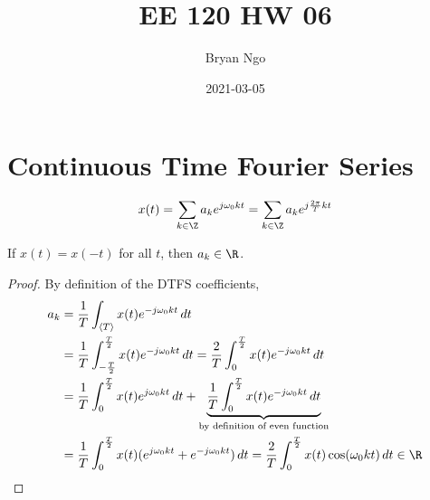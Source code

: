 \documentclass{article}
\title{EE 120 HW 06}
\author{Bryan Ngo}
\date{2021-03-05}
\begin{document}
\maketitle

\section{Continuous Time Fourier Series}

\begin{equation}
    x(t) = \sum_{k \in \Z} a_k e^{j \omega_0 k t} = \sum_{k \in \Z} a_k e^{j \frac{2\pi}{T} kt}
\end{equation}

\begin{theorem}
    If \(x(t) = x(-t)\) for all \(t\), then \(a_k \in \R\).
\end{theorem}
\begin{proof}
    By definition of the DTFS coefficients,
    \begin{align}
        a_k &= \frac{1}{T} \int_{\langle T \rangle} x(t) e^{-j \omega_0 k t} \, dt \\
        &= \frac{1}{T} \int_{-\frac{T}{2}}^{\frac{T}{2}} x(t) e^{-j \omega_0 k t} \, dt = \frac{2}{T} \int_0^{\frac{T}{2}} x(t) e^{-j \omega_0 k t} \, dt \\
        &= \frac{1}{T} \int_0^{\frac{T}{2}} x(t) e^{j \omega_0 k t} \, dt + \underbrace{\frac{1}{T} \int_0^{\frac{T}{2}} x(t) e^{-j \omega_0 k t} \, dt}_{\text{by definition of even function}} \\
        &= \frac{1}{T} \int_0^{\frac{T}{2}} x(t) (e^{j \omega_0 k t} + e^{-j \omega_0 k t}) \, dt = \frac{2}{T} \int_0^{\frac{T}{2}} x(t) \cos(\omega_0 k t) \, dt \in \R
    \end{align}
\end{proof}

\subsection{}
\end{document}
